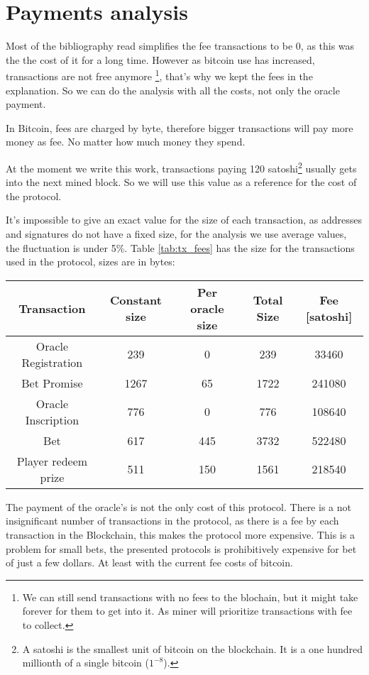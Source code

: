 \section {Payments analysis}

Most of the bibliography read simplifies the fee transactions to be 0,
  as this was the the cost of it for a long time.
However as bitcoin use has increased, transactions are not free anymore
  \footnote{We can still send transactions with no fees to the blochain, but it
    might take forever for them to get into it. As miner will prioritize
    transactions with fee to collect.}, that's why we kept the fees in the
  explanation.
So we can do the analysis with all the costs, not only the oracle payment.

In Bitcoin, fees are charged by byte, therefore bigger transactions will pay more
  money as fee.
No matter how much money they spend.

At the moment we write this work, transactions paying 120 satoshi\footnote{A
  satoshi is the smallest unit of bitcoin on the blockchain. It is a one hundred
  millionth of a single bitcoin ($1^{-8}$).} usually gets into the next mined
  block.
So we will use this value as a reference for the cost of the protocol.

It's impossible to give an exact value for the size of each transaction, as
  addresses and signatures do not have a fixed size, for the analysis we use
  average values, the fluctuation is under 5\%.
Table \ref{tab:tx_fees} has the size for the transactions used in the protocol,
  sizes are in bytes:

\begin{center}
    \begin{tabular}{|c||c|c|c|c|}
      \hline
      \textbf{Transaction} & \textbf{Constant size} &
        \textbf{Per oracle size} & \textbf{Total Size} &
        \textbf{Fee [satoshi]} \\
      \hline
        Oracle Registration & 239 & 0 & 239 & \num{33460} \\
      \hline
        Bet Promise & 1267 & 65 & 1722 & \num{241080} \\
      \hline
        Oracle Inscription & 776 & 0 & 776 & \num{108640} \\
      \hline
        Bet & 617 & 445 & 3732 & \num{522480} \\
      \hline
      \hline
        Player redeem prize & 511 & 150 & 1561 & 218540 \\
      \hline
    \end{tabular}
    \label{tab:tx_fees}
\end{center}



The payment of the oracle's is not the only cost of this protocol.
There is a not insignificant number of transactions in the protocol, as there
  is a fee by each transaction in the Blockchain, this makes the protocol more
  expensive.
This is a problem for small bets, the presented protocols is prohibitively
  expensive for bet of just a few dollars. At least with the current fee costs
  of bitcoin.

